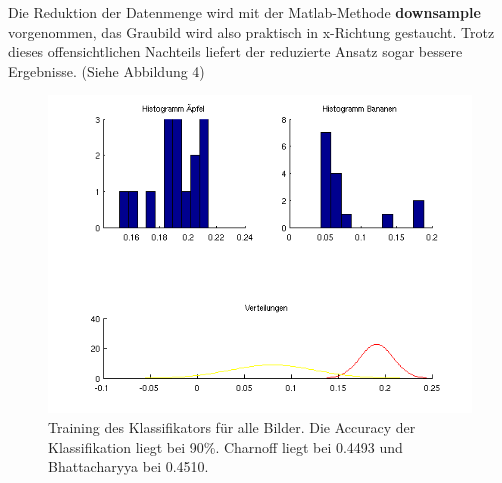 \documentclass[a4paper,10pt]{article}
\begin{document}
Die Reduktion der Datenmenge wird mit der Matlab-Methode \textbf{downsample} vorgenommen, das Graubild wird also praktisch in x-Richtung gestaucht. Trotz dieses offensichtlichen Nachteils liefert der reduzierte Ansatz sogar bessere Ergebnisse. (Siehe Abbildung 4)

\begin{figure}[htbp]
  \centering
    \includegraphics[width=1\linewidth]{plot4.png}
  
  \caption{Training des Klassifikators für alle Bilder. Die Accuracy der Klassifikation liegt bei 90\%. Charnoff liegt bei 0.4493 und Bhattacharyya bei 0.4510.}
\end{figure}
\end{document}
